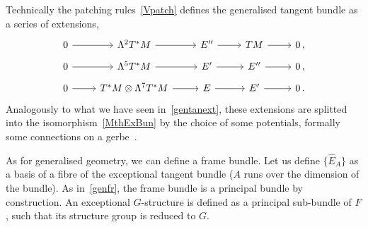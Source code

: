 \documentclass[debug]{phd}
\begin{document}
												
						
						Technically the patching rules~\eqref{Vpatch} defines the generalised tangent bundle as a series of extensions,
								\begin{equation}
									\begin{tikzcd}[row sep=tiny]
										0 \arrow{r} &\Lambda^2 T^*M \arrow{r} &E'' \arrow{r} &TM \arrow{r} &0 	\, , \\
										0 \arrow{r} &\Lambda^5 T^*M \arrow{r} &E' \arrow{r} &E'' \arrow{r} &0 	\, , \\
										0 \arrow{r} &T^*M \otimes \Lambda^7 T^*M \arrow{r} &E \arrow{r} &E' \arrow{r} &0 \, .
									\end{tikzcd}
								\end{equation}
						Analogously to what we have seen in~\eqref{gentanext}, these extensions are splitted~\cite{Hatcher} into the isomorphism~\eqref{MthExBun} by the choice of some potentials, formally some connections on a gerbe~\cite{HitchinLagrangian}.
						
%						
						As for generalised geometry, we can define a frame bundle.
						Let us define $\{\hat{E}_A\}$ as a basis of a fibre of the exceptional tangent bundle ($A$ runs over the dimension of the bundle).
						As in~\eqref{genfr}, the frame bundle is a principal bundle by construction.
						An exceptional $G$-structure is defined as a principal sub-bundle of $F$, such that its structure group is reduced to $G$.
						
\end{document}
